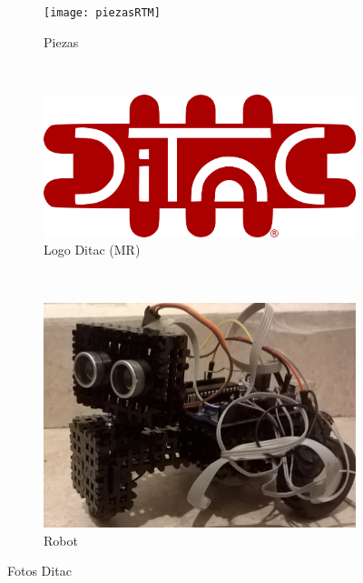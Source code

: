 \documentclass[]{article}
\begin{document}
\begin{figure}[h!]
	\centering
	\begin{subfigure}[b]{0.3\textwidth}
		\texttt{[image: piezasRTM]}
		\caption{Piezas}
	\end{subfigure}
	~ %
	\begin{subfigure}[b]{0.3\textwidth}	
		\includegraphics[width=1\textwidth]{LogoDitacReg}
		\caption{Logo Ditac (MR)}
	\end{subfigure}
	~ %
	\begin{subfigure}[b]{0.3\textwidth}
		\includegraphics[width=1\textwidth]{mecaRTM}	
		\caption{Robot}
	\end{subfigure}

	\caption{Fotos Ditac}
	\label{fig:Ditac}
\end{figure}
\end{document}
